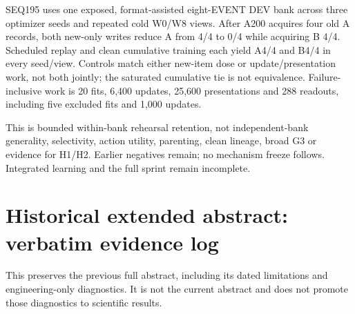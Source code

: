 \documentclass[11pt]{article}
\begin{document}
SEQ195 uses one exposed, format-assisted eight-EVENT DEV bank across three
optimizer seeds and repeated cold W0/W8 views. After A200 acquires four old A
records, both new-only writes reduce A from 4/4 to 0/4 while acquiring B 4/4.
Scheduled replay and clean cumulative training each yield A4/4 and B4/4 in
every seed/view. Controls match either new-item dose or update/presentation
work, not both jointly; the saturated cumulative tie is not equivalence.
Failure-inclusive work is 20 fits, 6,400 updates, 25,600 presentations and 288
readouts, including five excluded fits and 1,000 updates.

This is bounded within-bank rehearsal retention, not independent-bank
generality, selectivity, action utility, parenting, clean lineage, broad G3 or
evidence for H1/H2. Earlier negatives remain; no mechanism freeze follows.
Integrated learning and the full sprint remain incomplete.

\section*{Historical extended abstract: verbatim evidence log}
\noindent This preserves the previous full abstract, including its dated
limitations and engineering-only diagnostics. It is not the current abstract
and does not promote those diagnostics to scientific results.
\end{document}
